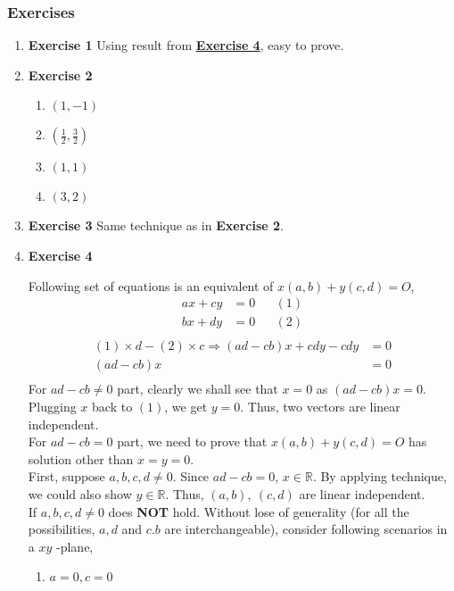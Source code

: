\documentclass[11pt]{article}
\begin{document}
\subsubsection{Exercises}
\label{sec:orgc385dfb}
\begin{enumerate}
\item \textbf{Exercise 1}
\label{sec:org7b2a7ed}
Using result from \hyperref[org5ea3f40]{\textbf{Exercise 4}}, easy to prove.
\item \textbf{Exercise 2}
\label{sec:org34f2a89}
\begin{enumerate}
\item \((1,-1)\)
\label{sec:org9ad4164}
\item \((\frac{1}{2},\frac{3}{2})\)
\label{sec:orgab5393a}
\item \((1,1)\)
\label{sec:org58c49b0}
\item \((3,2)\)
\label{sec:org293b197}
\end{enumerate}
\item \textbf{Exercise 3}
\label{sec:org5a0a83a}
Same technique as in \textbf{Exercise 2}.
\item \textbf{Exercise 4}
\label{sec:orgbe7743b}
\label{org5ea3f40}

Following set of equations is an equivalent of \(x(a,b)+y(c,d)=O\),
$$\begin{aligned}
ax+cy&=0 && (1)\\
bx+dy&=0 && (2)\\
\end{aligned}$$
$$\begin{aligned}
(1)\times d-(2)\times c\Rightarrow (ad-cb)x+cdy-cdy &= 0\\
(ad-cb)x&=0\\
\end{aligned}$$
For \(ad-cb\not =0\) part, clearly we shall see that \(x=0\) as \((ad-cb)x=0\). Plugging \(x\) back to \((1)\), we get \(y=0\). Thus, two vectors are linear independent.\\
For \(ad-cb=0\) part, we need to prove that \(x(a,b)+y(c,d)=O\) has solution other than \(x=y=0\).\\
First, suppose \(a,b,c,d\not = 0\). Since \(ad-cb=0\), \(x\in \mathbb{R}\). By applying technique, we could also show \(y\in \mathbb{R}\). Thus, \((a,b),\ (c,d)\) are linear independent.\\
If \(a,b,c,d\not = 0\) does \textbf{NOT} hold. Without lose of generality (for all the possibilities, \(a,d\) and \(c.b\) are interchangeable), consider following scenarios in a \(xy\) -plane,
\begin{enumerate}
\item \(a=0,c=0\)
\label{sec:org5641b55}


\end{enumerate}
\end{enumerate}
\end{document}
